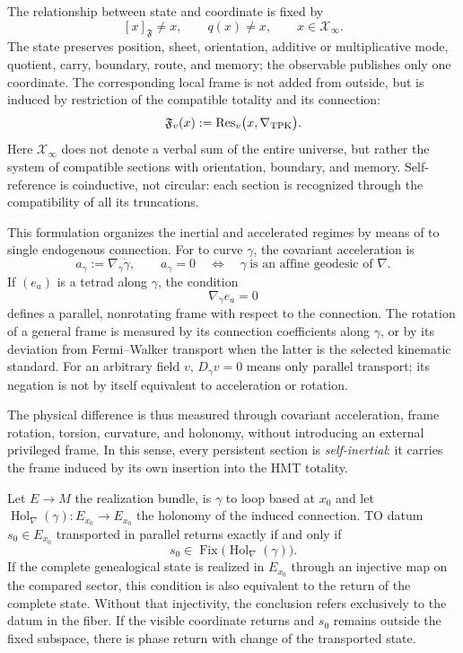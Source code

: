 The relationship between state and coordinate is fixed by
\[
 [x]_{\mathfrak F}\ne x,
 \qquad
 q(x)\ne x,
 \qquad
 x\in\mathcal X_\infty.
\]
The state preserves position, sheet, orientation, additive or
multiplicative mode, quotient, carry, boundary, route, and memory; the observable
publishes only one coordinate. The corresponding local frame is not added from
outside, but is induced by restriction of the compatible totality and its
connection:
\begin{equation}
 \mathfrak F_v(x)
 :=\operatorname{Res}_v\bigl(x,
          \nabla_{\rm TPK}\bigr).
 \label{eq:marco-local-totalidad-rev10}
\end{equation}
Here \(\mathcal X_\infty\) does not denote a verbal sum of the entire universe,
but rather the system of compatible sections with orientation, boundary, and memory.
Self-reference is coinductive, not circular: each section is recognized through
the compatibility of all its truncations.

This formulation organizes the inertial and accelerated regimes by means of to
single endogenous connection. For to curve \(\gamma\), the covariant acceleration
is
\[
 a_\gamma:=\nabla_{\dot\gamma}\dot\gamma,
 \qquad
 a_\gamma=0
 \quad\Longleftrightarrow\quad
 \gamma\ \text{is an affine geodesic of }\nabla.
\]
If \((e_a)\) is a tetrad along \(\gamma\), the condition
\[
 \nabla_{\dot\gamma}e_a=0
\]
defines a parallel, nonrotating frame with respect to the connection. The rotation
of a general frame is measured by its connection coefficients along
\(\gamma\), or by its deviation from Fermi--Walker transport
when the latter is the selected kinematic standard. For an arbitrary field
\(v\), \(D_\gamma v=0\) means only parallel transport; its
negation is not by itself equivalent to acceleration or rotation.

The physical difference is thus measured through covariant acceleration,
frame rotation, torsion, curvature, and holonomy, without introducing an external
privileged frame. In this sense, every persistent section is
\emph{self-inertial}: it carries the frame induced by its own insertion into the
HMT totality.

\begin{proposition}
\label{prop:autoinercia-holonomia-rev2}
Let \(E\to M\) the realization bundle, is \(\gamma\) to loop based at
\(x_0\) and let
\(\operatorname{Hol}_{\nabla}(\gamma):E_{x_0}\to E_{x_0}\) the holonomy of
the induced connection. TO datum \(s_0\in E_{x_0}\) transported in parallel
returns exactly if and only if
\[
 s_0\in\operatorname{Fix}
 \bigl(\operatorname{Hol}_{\nabla}(\gamma)\bigr).
\]
If the complete genealogical state is realized in \(E_{x_0}\) through an
injective map on the compared sector, this condition is also equivalent
to the return of the complete state. Without that injectivity, the conclusion
refers exclusively to the datum in the fiber. If the visible coordinate returns and
\(s_0\) remains outside the fixed subspace, there is phase return with
change of the transported state.
\end{proposition}

